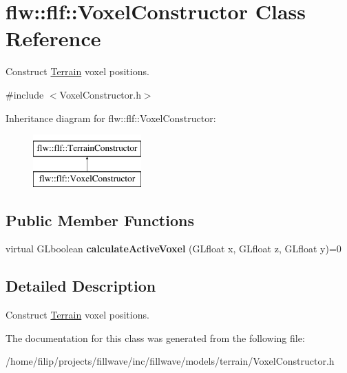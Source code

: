 \hypertarget{classflw_1_1flf_1_1VoxelConstructor}{}\section{flw\+:\+:flf\+:\+:Voxel\+Constructor Class Reference}
\label{classflw_1_1flf_1_1VoxelConstructor}


Construct \hyperlink{classflw_1_1flf_1_1Terrain}{Terrain} voxel positions.  




{\ttfamily \#include $<$Voxel\+Constructor.\+h$>$}

Inheritance diagram for flw\+:\+:flf\+:\+:Voxel\+Constructor\+:\begin{figure}[H]
\begin{center}
\leavevmode
\includegraphics[height=2.000000cm]{classflw_1_1flf_1_1VoxelConstructor}
\end{center}
\end{figure}
\subsection*{Public Member Functions}
\begin{DoxyCompactItemize}
\item 
\mbox{\label{classflw_1_1flf_1_1VoxelConstructor_a98015c342b6d5aa6ebf810798c57a365}} 
virtual G\+Lboolean {\bfseries calculate\+Active\+Voxel} (G\+Lfloat x, G\+Lfloat z, G\+Lfloat y)=0
\end{DoxyCompactItemize}


\subsection{Detailed Description}
Construct \hyperlink{classflw_1_1flf_1_1Terrain}{Terrain} voxel positions. 

The documentation for this class was generated from the following file\+:\begin{DoxyCompactItemize}
\item 
/home/filip/projects/fillwave/inc/fillwave/models/terrain/Voxel\+Constructor.\+h\end{DoxyCompactItemize}
